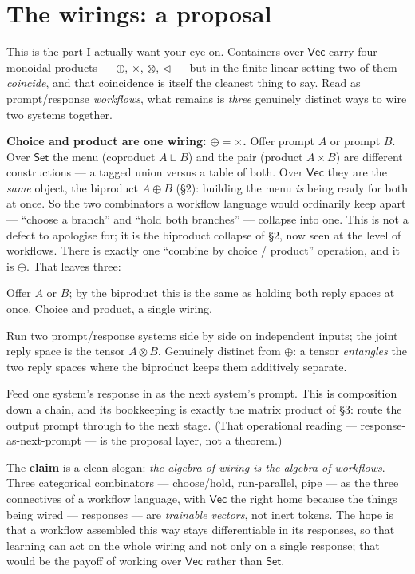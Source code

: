 \documentclass[11pt]{article}
\providecommand{\Vec}{}\renewcommand{\Vec}{\mathsf{Vec}}
\newcommand{\Set}{\mathsf{Set}}
\begin{document}
\section{The wirings: a proposal}

This is the part I actually want your eye on. Containers over $\Vec$ carry four monoidal
products --- $\oplus$, $\times$, $\otimes$, $\lhd$ --- but in the finite linear setting two
of them \emph{coincide}, and that coincidence is itself the cleanest thing to say. Read as
prompt/response \emph{workflows}, what remains is \emph{three} genuinely distinct ways to
wire two systems together.

\textbf{Choice and product are one wiring: $\oplus = \times$.} Offer prompt $A$ or prompt
$B$. Over $\Set$ the menu (coproduct $A\sqcup B$) and the pair (product $A\times B$) are
different constructions --- a tagged union versus a table of both. Over $\Vec$ they are the
\emph{same} object, the biproduct $A\oplus B$ (\S2): building the menu \emph{is} being ready
for both at once. So the two combinators a workflow language would ordinarily keep
apart --- ``choose a branch'' and ``hold both branches'' --- collapse into one. This is not
a defect to apologise for; it is the biproduct collapse of \S2, now seen at the level of
workflows. There is exactly one ``combine by choice / product'' operation, and it is
$\oplus$. That leaves three:

\begin{description}[leftmargin=1.2em,style=nextline]
\item[$\oplus$ --- menu / both.] Offer $A$ or $B$; by the biproduct this is the same as
  holding both reply spaces at once. Choice and product, a single wiring.
\item[$\otimes$ --- parallel.] Run two prompt/response systems side by side on independent
  inputs; the joint reply space is the tensor $A\otimes B$. Genuinely distinct from
  $\oplus$: a tensor \emph{entangles} the two reply spaces where the biproduct keeps them
  additively separate.
\item[$\lhd$ --- pipeline.] Feed one system's response in as the next system's prompt.
  This is composition down a chain, and its bookkeeping is exactly the matrix product of
  \S3: route the output prompt through to the next stage. (That operational reading ---
  response-as-next-prompt --- is the proposal layer, not a theorem.)
\end{description}

The \textbf{claim} is a clean slogan: \emph{the algebra of wiring is the algebra of
workflows}. Three categorical combinators --- choose/hold, run-parallel, pipe --- as the
three connectives of a workflow language, with $\Vec$ the right home because the things
being wired --- responses --- are \emph{trainable vectors}, not inert tokens. The hope is
that a workflow assembled this way stays differentiable in its responses, so that learning
can act on the whole wiring and not only on a single response; that would be the payoff of
working over $\Vec$ rather than $\Set$.
\end{document}

